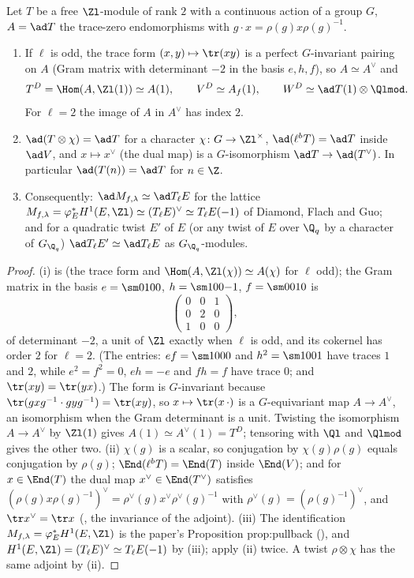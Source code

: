 \begin{proposition}\label{prop:blochkato:adjoint-self-dual}
Let $T$ be a free $\Zl$-module of rank $2$ with a continuous action of a group $G$, $A=\ad T$ the trace-zero endomorphisms with $g\cdot x=\rho(g)x\rho(g)^{-1}$.
\begin{enumerate}[label=(\roman*)]
\item If $\ell$ is odd, the trace form $(x,y)\mapsto\tr(xy)$ is a perfect $G$-invariant pairing on $A$ (Gram matrix with determinant $-2$ in the basis $e,h,f$), so
$A\simeq A^\vee$ and
\[
T^D=\Hom(A,\Zl(1))\simeq A(1),\qquad V^D\simeq A_f(1),\qquad W^D\simeq\ad T(1)\otimes\Qlmod .
\]
For $\ell=2$ the image of $A$ in $A^\vee$ has index $2$.
\item $\ad(T\otimes\chi)=\ad T$ for a character $\chi\colon G\to\Zl^\times$, $\ad(\ell^bT)=\ad T$ inside $\ad V$, and $x\mapsto x^\vee$ (the dual map) is a $G$-isomorphism
$\ad T\to\ad(T^\vee)$. In particular $\ad(T(n))=\ad T$ for $n\in\Z$.
\item Consequently: $\ad M_{f,\lambda}\simeq\ad T_\ell E$ for the lattice $M_{f,\lambda}=\varphi_E^*H^1(E,\Zl)\simeq(T_\ell E)^\vee\simeq T_\ell E(-1)$ of Diamond, Flach and Guo; and for a
quadratic twist $E'$ of $E$ (or any twist of $E$ over $\Q_q$ by a character of $G_{\Q_q}$) $\ad T_\ell E'\simeq\ad T_\ell E$ as $G_{\Q_q}$-modules.
\end{enumerate}
\end{proposition}

\begin{proof}
(i) is  (the trace form and $\Hom(A,\Zl(\chi))\simeq A(\chi)$ for $\ell$ odd); the Gram matrix in the basis $e=\sm0100$, $h=\sm100{-1}$, $f=\sm0010$ is
\[
\begin{pmatrix}0&0&1\\0&2&0\\1&0&0\end{pmatrix},
\]
of determinant $-2$, a unit of $\Zl$ exactly when $\ell$ is odd, and its cokernel has order $2$ for $\ell=2$. (The entries: $ef=\sm1000$ and $h^2=\sm1001$ have traces
$1$ and $2$, while $e^2=f^2=0$, $eh=-e$ and $fh=f$ have trace $0$; and $\tr(xy)=\tr(yx)$.) The form is $G$-invariant because
$\tr(gxg^{-1}\cdot gyg^{-1})=\tr(xy)$, so $x\mapsto\tr(x\,\cdot)$ is a $G$-equivariant map $A\to A^\vee$, an isomorphism when the Gram determinant is a unit. Twisting the isomorphism $A\to A^\vee$ by $\Zl(1)$
gives $A(1)\simeq A^\vee(1)=T^D$; tensoring with $\Ql$ and $\Qlmod$ gives the other two. (ii) $\chi(g)$ is a scalar, so conjugation by $\chi(g)\rho(g)$ equals
conjugation by $\rho(g)$; $\End(\ell^bT)=\End(T)$ inside $\End(V)$; and for $x\in\End(T)$ the dual map $x^\vee\in\End(T^\vee)$ satisfies
$(\rho(g)x\rho(g)^{-1})^\vee=\rho^\vee(g)x^\vee\rho^\vee(g)^{-1}$ with $\rho^\vee(g)=(\rho(g)^{-1})^\vee$, and $\tr x^\vee=\tr x$ (, the invariance of the adjoint).
(iii) The identification $M_{f,\lambda}=\varphi_E^*H^1(E,\Zl)$ is the paper's Proposition prop:pullback (), and $H^1(E,\Zl)=(T_\ell E)^\vee\simeq T_\ell E(-1)$ by
(iii); apply (ii) twice. A twist $\rho\otimes\chi$ has the same adjoint by (ii).
\end{proof}

